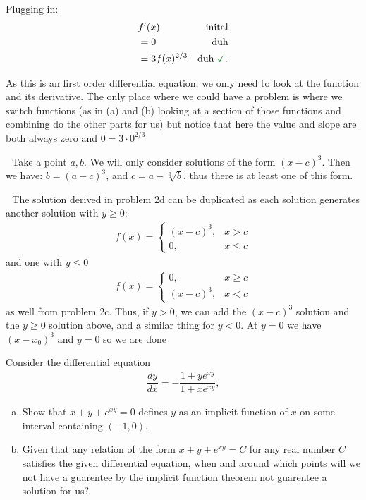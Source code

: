 \documentclass{article}
\begin{document}
\begin{solution}[Problem 2b]
    Plugging in:
    \begin{align*}
        &f'(x)   & \text{inital}\\ 
        &= 0 & \text{duh} \\ 
        &= 3f(x)^{2/3} & \text{duh \done}.
    \end{align*}
\end{solution}
\begin{solution}[Problem 2c]
    As this is an first order differential equation, we only need to look at the function and its derivative. The only place where we could
    have a problem is where we switch functions (as in (a) and (b) looking at a section of those functions and combining do the other parts 
    for us) but notice that here the value and slope are both always zero and $0 = 3 \cdot 0^{2/3}$ \done
\end{solution}
\begin{solution}[Problem 2d]
    \no$\text{ }$Take a point $a,b$. We will only consider solutions of the form $(x-c)^3$. Then we have: $b = (a-c)^3$,
    and $c = a - \sqrt[3]{b}$, thus there is at least one of this form. \done
\end{solution}
\begin{solution}[Problem 2e]
    \no$\text{ }$The solution derived in problem 2d can be duplicated as each solution generates another solution with $y \ge 0$:
    \begin{align*}
        f(x) = 
        \begin{cases}
            {(x-c)}^3, & x>c \\ 
            0, &x \le c
        \end{cases}   
    \end{align*}
    and one with $y \le 0$ 
    \begin{align*}
        f(x) = 
        \begin{cases}
            0, & x\ge c \\ 
            {(x-c)}^3, &x <c
        \end{cases}   
    \end{align*} 
    as well from problem 2c. Thus, if $y>0$, we can add the $(x-c)^3$ solution and the $y \ge 0$ solution above, and a similar thing for $y < 0$. 
    At $y=0$ we have $(x-x_0)^3$ and $y=0$ so we are done \done
\end{solution}
\begin{problem}
    Consider the differential equation 
    \begin{align*}
        \dfrac{dy}{dx} = - \dfrac{1 + ye^{xy}}{1+xe^{xy}},
    \end{align*}
    \begin{enumerate}[(a)]
    \item Show that $x + y + e^{xy} = 0$ defines $y$ as an implicit function of $x$ on some interval containing $(-1, 0)$.
    \item Given that any relation of the form $x+y+e^{xy}=C$ for any real number $C$
    satisfies the given differential equation, when and around which points will we not have a guarentee by the implicit function theorem not guarentee a solution
    for us?
    \end{enumerate}
\end{problem}
\end{document}
